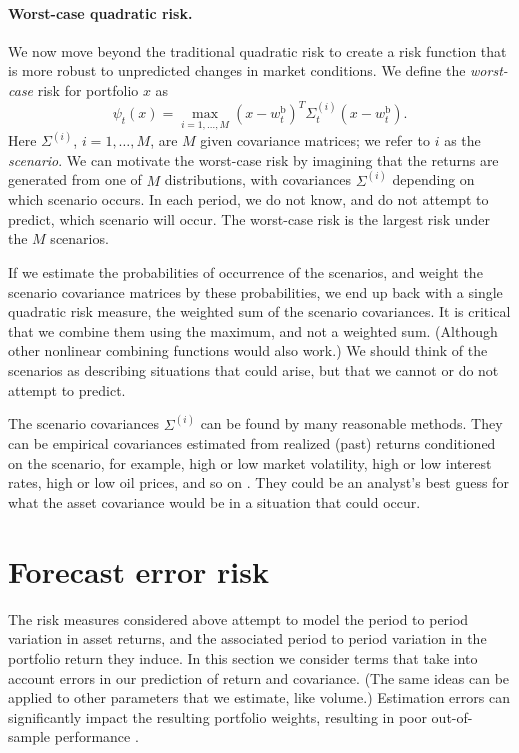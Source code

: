 \documentclass[openany]{article}  %
\newcommand{\wb}{w^\mathrm{b}}
\begin{document}
\paragraph{Worst-case quadratic risk.}
We now move beyond the traditional quadratic risk to create a
risk function that is more robust to unpredicted
changes in market conditions. We define the
\emph{worst-case} risk for portfolio $x$ as
\[
\psi_t(x) = \max_{i = 1, \ldots, M} (x-\wb_t)^T\Sigma^{(i)}_t (x-\wb_t).
\]
Here $\Sigma^{(i)}$, $i=1,\ldots, M$,
are $M$ given covariance matrices;
we refer to $i$ as the \emph{scenario}.
We can motivate the worst-case risk
by imagining that the returns are generated from one of $M$ distributions,
with covariances $\Sigma^{(i)}$ depending on which scenario occurs.
In each period, we do not know, and do not attempt to predict, which scenario
will occur.
The worst-case risk is the largest risk under the $M$ scenarios.

If we estimate the probabilities of occurrence of
the scenarios, and weight the scenario covariance matrices by these probabilities,
we end up back with a single quadratic risk measure,
the weighted sum of the scenario covariances.
It is critical that we combine them using the maximum, and not a
weighted sum. (Although other nonlinear combining functions would also work.)
We should think of the scenarios as describing situations that could arise,
but that we cannot or do not attempt to predict.

The scenario covariances $\Sigma^{(i)}$ can be found by many reasonable methods.
They can be empirical covariances estimated from realized (past) returns conditioned on the
scenario, for example, high or low market volatility, high or low interest rates,
high or low oil prices, and so on \cite{meucci2010historical}.
They could be an analyst's best guess for what the asset covariance would be
in a situation that could occur.


\section{Forecast error risk}
The risk measures considered above attempt to model the period to period
variation in asset returns, and the associated period to period variation in the
portfolio return they induce.
In this section we consider terms that take into account errors in
our prediction of return and covariance.
(The same ideas can be applied to other parameters that we estimate, like
volume.)
Estimation errors can significantly impact the resulting portfolio
weights, resulting in poor out-of-sample performance
\cite{jorion1985international,michaud1989markowitz,chopra1993effect,
kan2007optimal,demiguel2009optimal,fabozzi2010robust,kolm2014years, bailey2016probability}.
\end{document}
